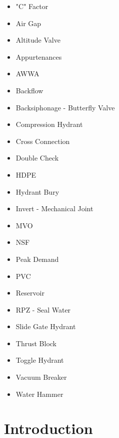 \documentclass[10pt]{article}
\begin{document}
\begin{itemize}
  \item "C" Factor

  \item Air Gap

  \item Altitude Valve

  \item Appurtenances

  \item AWWA

  \item Backflow

  \item Backsiphonage - Butterfly Valve

  \item Compression Hydrant

  \item Cross Connection

  \item Double Check

  \item HDPE

  \item Hydrant Bury

  \item Invert - Mechanical Joint

  \item MVO

  \item NSF

  \item Peak Demand

  \item PVC

  \item Reservoir

  \item RPZ - Seal Water

  \item Slide Gate Hydrant

  \item Thrust Block

  \item Toggle Hydrant

  \item Vacuum Breaker

  \item Water Hammer

\end{itemize}
\section{Introduction}
\end{document}
